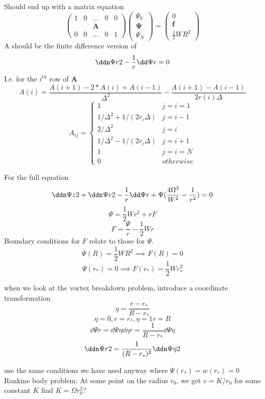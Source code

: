 \documentclass{X:/Documents/Coding/Latex/myreport}
\begin{document}
Should end up with a matrix equation
\[
\begin{pmatrix}
1 & 0&\hdots &0 & 0 \\
&&\mathbf{A}&&\\
0&0&\hdots & 0 & 1
\end{pmatrix}
\begin{pmatrix}
\Psi_0\\
\mathbf{\Psi}\\
\Psi_N
\end{pmatrix}
=
\begin{pmatrix}
0\\
\mathbf{f}\\
\frac12 W R^2
\end{pmatrix}
\]
A should be the finite difference version of 
\[\ddn \Psi r 2 - \frac1r \dd \Psi r = 0\]
I.e. for the $i^{th}$ row of $\mathbf{A}$
\[A(i) =\frac{A(i+1) - 2*A(i) + A(i-1)}{\Delta ^2} - \frac{A(i+1) - A(i-1)}{2r(i)\Delta } \]
\[A_{ij} =\begin{cases}
1    & j=i=1\\
1/\Delta^2 +1/(2r_i \Delta)& j=i-1\\
2/\Delta^2    & j=i\\
1/\Delta^2 -1/(2r_i \Delta)& j=i+1\\
1   & j=i=N\\
0   & otherwise
\end{cases}\]

For the full equation
\[\ddn\Psi z2 + \ddn\Psi r2 - \frac1r \dd\Psi r + \Psi(\frac{4\Omega^2}{W^2} - \frac1{r^2}) = 0 \]
\[\Psi = \frac12 Wr^2 + rF \]
\[F = \frac{\Psi}{r} - \frac12 Wr\]
Boundary conditions for $F$ relate to those for $\Psi$.
\[\Psi(R) = \frac12 WR^2 \implies F(R) = 0\]
\[\Psi(r_*) = 0 \implies F(r_*) = \frac12 Wr_*^2\]





when we look at the vortex breakdown problem, introduce a coordinate transformation
\[\eta = \frac{r - r_*}{R-r_*}\]
\[\eta = 0, r=r_*, \eta = 1 r=R\]
\[\dd\Psi r = \dd\Psi \eta \dd\eta r = \frac{1}{R-r_*} \dd\Psi \eta\]
\[\ddn \Psi r2 = \frac{1}{(R-r_*)^2} \ddn \Psi \eta 2\]



use the same conditions we have used anyway where $\Psi(r_*) = w(r_*) = 0$
Rankine body problem:
At some point on the radius $r_0$, we get $v = K/r_0$ for some constant $K$ 
find $K = \Omega r_0^2$?

\end{document}
